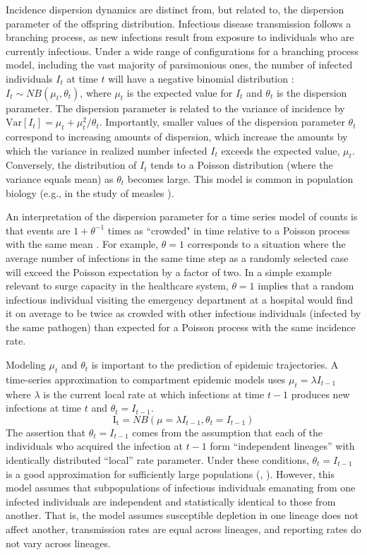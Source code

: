 \documentclass[10pt,letterpaper]{article}
\begin{document}
Incidence dispersion dynamics are distinct from, but related to, the dispersion parameter of the offspring distribution. 
Infectious disease transmission follows a branching process, as new infections result from exposure to individuals who are currently infectious. 
Under a wide range of configurations for a branching process model, including the vast majority of parsimonious ones, the number of infected individuals $I_t$ at time $t$ will have a negative binomial distribution \cite{kendall_stochastic_1949}: $I_t \sim NB \left( \mu_t, \theta_t \right)$, where $\mu_t$ is the expected value for $I_t$ and $\theta_t$ is the dispersion parameter. 
The dispersion parameter is related to the variance of incidence by $\mathrm{Var}[I_t] = \mu_t + \mu_t^2 / \theta_t$. 
Importantly, smaller values of the dispersion parameter $\theta_t$ correspond to increasing amounts of dispersion, which increase the amounts by which the variance in realized number infected $I_t$ exceeds the expected value, $\mu_t$. 
Conversely, the distribution of $I_t$ tends to a Poisson distribution (where the variance equals mean) as $\theta_t$ becomes large. 
This model is common in population biology (e.g., in the study of measles \cite{grenfell_dynamics_2002}).

An interpretation of the dispersion parameter for a time series model of counts is that events are $1 + \theta^{-1}$ times as ``crowded" in time relative to a Poisson process with the same mean \cite{lloyd_mean_1967}. For example, $\theta = 1$ corresponds to a situation where the average number of infections in the same time step as a randomly selected case will exceed the Poisson expectation by a factor of two. In a simple example relevant to surge capacity in the healthcare system, $\theta = 1$ implies that a random infectious individual visiting the emergency department at a hospital would find it on average to be twice as crowded with other infectious individuals (infected by the same pathogen) than expected for a Poisson process with the same incidence rate.

Modeling $\mu_t$ and $\theta_t$ is important to the prediction of epidemic trajectories. A time-series approximation to compartment epidemic models uses $\mu_t = \lambda I_{t-1}$ where $\lambda$ is the current local rate at which infections at time $t-1$ produces new infections at time $t$ and $\theta_t = I_{t-1}$. 
\begin{equation}
    \mathrm{I_t} = NB(\mu = \lambda I_{t-1}, \theta_t = I_{t-1})
\end{equation}
The assertion that $\theta_t = I_{t-1}$ comes from the assumption that each of the individuals who acquired the infection at $t-1$ form ``independent lineages'' with identically distributed ``local'' rate parameter. Under these conditions, $\theta_t = I_{t-1}$ is a good approximation for sufficiently large populations (\cite{kendall_stochastic_1949}, \cite{bjornstad_dynamics_nodate}). However, this model assumes that subpopulations of infectious individuals emanating from one infected individuals are independent and statistically identical to those from another. That is, the model assumes susceptible depletion in one lineage does not affect another, transmission rates are equal across lineages, and reporting rates do not vary across lineages. 
\end{document}

